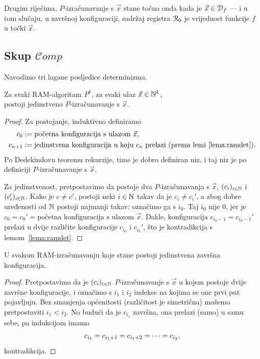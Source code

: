 Drugim riječima, $P$-izračunavanje s $\vec x$ stane točno onda kada je $\vec x\in\mathcal D_{f}$ --- i u tom slučaju, u završnoj konfiguraciji, sadržaj registra $\mathcal R_{0}$ je vrijednost funkcije $f$ u točki $\vec x$.

\subsection{Skup \texorpdfstring{$\mathscr Comp$}{Comp}}

Navodimo tri lagane posljedice determinizma.

\begin{propozicija}[{name=[jedinstvenost izračunavanja]}]\label{prop:ramdet}
Za svaki RAM-algoritam $P^k$, za svaki ulaz $\vec x\in{\mathbb N}^k$,\\ postoji jedinstveno $P$-izračunavanje s $\vec x$.
\end{propozicija}
\begin{proof}
Za postojanje, induktivno definiramo
\begin{align}
    c_0&:=\text{početna konfiguracija s ulazom $\vec x$,}\\
    c_{n+1}&:=\text{jedinstvena konfiguracija u koju $c_n$ prelazi (prema lemi~\ref{lema:ramdet}).}
\end{align}
Po Dedekindovu teoremu rekurzije, time je dobro definiran niz, i taj niz je po definiciji $P$-iz\-ra\-ču\-na\-va\-nje s $\vec x$.

Za jedinstvenost, pretpostavimo da postoje dva $P$-izračunavanja s $\vec x$, $(c_i)_{i\in{\mathbb N}}$ i $(c_i')_{i\in{\mathbb N}}$.
Kako je $c\ne c'$, postoji neki $i\in{\mathbb N}$ takav da je $c_i\ne c_i'$, a zbog dobre uređenosti od ${\mathbb N}$ postoji najmanji takav: označimo ga s $i_0$.
Taj $i_0$ nije $0$, jer je $c_0=c_0'=\text{početna konfiguracija s ulazom $\vec x$}$. Dakle, konfiguracija $c_{i_0-1}=c_{i_0-1}'$ prelazi u dvije različite konfiguracije $c_{i_0}$ i $c_{i_0}'$, što je kontradikcija s lemom~\ref{lema:ramdet}.
\end{proof}

\begin{propozicija}[{name=[jedinstvenost završne konfiguracije]}]\label{prop:ram1zav}
U svakom RAM-izračunavanju koje stane postoji jedinstvena završna konfiguracija.
\end{propozicija}
\begin{proof}
Pretpostavimo da je $(c_i)_{i\in{\mathbb N}}$ $P$-izračunavanje s $\vec x$ u kojem postoje dvije završne konfiguracije, i označimo s $i_1$ i $i_2$ indekse na kojima se one prvi put pojavljuju. Bez smanjenja općenitosti (različitost je simetrična) možemo pretpostaviti $i_1<i_2$. No budući da je $c_{i_1}$ završna, ona prelazi (samo) u samu sebe, pa indukcijom imamo
\begin{equation}
    c_{i_1}=c_{i_1+1}=c_{i_1+2}=\dotsb=c_{i_2}\text,
\end{equation}
kontradikcija.
\end{proof}

